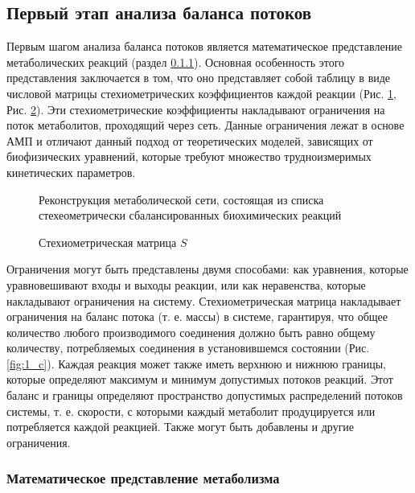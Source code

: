 \documentclass[a4paper, 12pt]{article}
\begin{document}
\subsection{Первый этап анализа баланса потоков}

Первым шагом анализа баланса потоков является математическое представление метаболических реакций (раздел \ref{1.1.1}). Основная особенность этого представления заключается в том, что оно представляет собой таблицу в виде числовой матрицы стехиометрических коэффициентов каждой реакции (Рис. \ref{fig:1_a}, Рис. \ref{fig:1_b}). Эти стехиометрические коэффициенты накладывают ограничения на поток метаболитов, проходящий через сеть. Данные ограничения лежат в основе АМП и отличают данный подход от теоретических моделей, зависящих от биофизических уравнений, которые требуют множество трудноизмеримых кинетических параметров.
\begin{figure}[h]
    \caption{Реконструкция метаболической сети, состоящая из списка стехеометрически сбалансированных биохимических реакций}
    \label{fig:1_a}
\end{figure}

\begin{figure}[h]
    \caption{Стехиометрическая матрица $S$}
    \label{fig:1_b}
\end{figure}

Ограничения могут быть представлены двумя способами: как уравнения, которые уравновешивают входы и выходы реакции, или как неравенства, которые накладывают ограничения на систему. Стехиометрическая матрица накладывает ограничения на баланс потока (т. е. массы) в системе, гарантируя, что общее количество любого производимого соединения должно быть равно общему количеству, потребляемых соединения в установившемся состоянии (Рис. \ref{fig:1_c}). Каждая реакция может также иметь верхнюю и нижнюю границы, которые определяют максимум и минимум допустимых потоков реакций. Этот баланс и границы определяют пространство допустимых распределений потоков системы, т. е. скорости, с которыми каждый метаболит продуцируется или потребляется каждой реакцией. Также могут быть добавлены и другие ограничения.

\subsubsection{Математическое представление метаболизма} \label{1.1.1}
\end{document}
